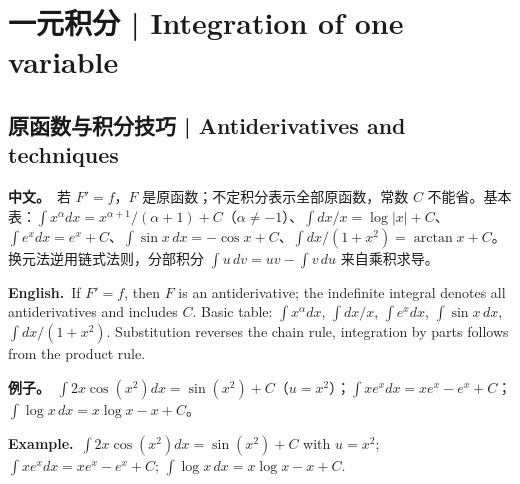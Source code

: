 \documentclass[UTF8,11pt,a4paper]{ctexart}
\newcommand{\BOTH}[2]{\par\noindent\textbf{中文。}\ #1\par\noindent\textbf{English.}\ #2\par}
\newcommand{\EX}[2]{\par\noindent\textbf{例子。}\ #1\par\noindent\textbf{Example.}\ #2\par}
\begin{document}
\section{一元积分 | Integration of one variable}

\subsection{原函数与积分技巧 | Antiderivatives and techniques}
\BOTH{若 $F'=f$，$F$ 是原函数；不定积分表示全部原函数，常数 $C$ 不能省。基本表：$\int x^\alpha dx=x^{\alpha+1}/(\alpha+1)+C$（$\alpha\ne-1$）、$\int dx/x=\log|x|+C$、$\int e^xdx=e^x+C$、$\int\sin x\,dx=-\cos x+C$、$\int dx/(1+x^2)=\arctan x+C$。换元法逆用链式法则，分部积分 $\int u\,dv=uv-\int v\,du$ 来自乘积求导。}{If $F'=f$, then $F$ is an antiderivative; the indefinite integral denotes all antiderivatives and includes $C$. Basic table: $\int x^\alpha dx$, $\int dx/x$, $\int e^xdx$, $\int\sin x\,dx$, $\int dx/(1+x^2)$. Substitution reverses the chain rule, integration by parts follows from the product rule.}
\EX{$\int2x\cos(x^2)dx=\sin(x^2)+C$（$u=x^2$）；$\int xe^xdx=xe^x-e^x+C$；$\int\log x\,dx=x\log x-x+C$。}{$\int2x\cos(x^2)dx=\sin(x^2)+C$ with $u=x^2$; $\int xe^xdx=xe^x-e^x+C$; $\int\log x\,dx=x\log x-x+C$.}
\end{document}
